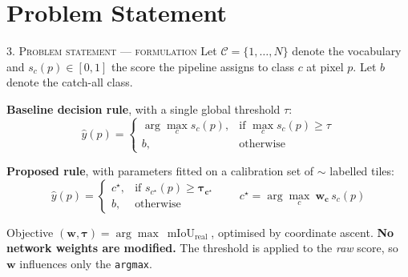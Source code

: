 \documentclass[aspectratio=169]{beamer}
\newcommand{\best}[1]{\textcolor{acc}{\textbf{#1}}}
\begin{document}
\section{Problem Statement}
\begin{frame}{\textsc{3. Problem statement --- formulation}}
\small
Let $\mathcal{C}=\{1,\dots,N\}$ denote the vocabulary and $s_c(p)\in[0,1]$ the
score the pipeline assigns to class $c$ at pixel $p$. Let $b$ denote the
catch-all class.

\vspace{0.4em}
\textbf{Baseline decision rule}, with a single global threshold $\tau$:
\[
  \hat{y}(p)=
  \begin{cases}
    \arg\max_{c} s_c(p), & \text{if } \max_c s_c(p) \ge \tau\\[2pt]
    b, & \text{otherwise}
  \end{cases}
\]

\textbf{Proposed rule}, with parameters fitted on a calibration set of
$\sim$\calibTiles{} labelled tiles:
\[
  \hat{y}(p)=
  \begin{cases}
    c^\star, & \text{if } s_{c^\star}(p) \ge \boldsymbol{\tau_{c^\star}}\\
    b, & \text{otherwise}
  \end{cases}
  \qquad
  c^\star = \arg\max_{c}\ \boldsymbol{w_c}\, s_c(p)
\]

\vspace{0.3em}
\begin{block}{Objective}
$(\boldsymbol{w},\boldsymbol{\tau}) = \arg\max\ \operatorname{mIoU}_{\text{real}}$,
optimised by coordinate ascent. \best{No network weights are modified.} The
threshold is applied to the \emph{raw} score, so $\boldsymbol{w}$ influences only
the \texttt{argmax}.
\end{block}
\end{frame}
\end{document}
